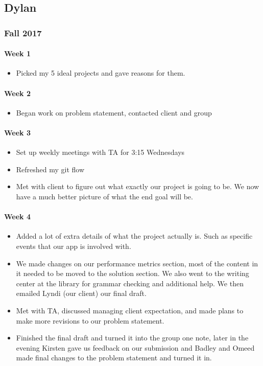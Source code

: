 \documentclass[onecolumn, draftclsnofoot,10pt, compsoc]{IEEEtran}
\begin{document}
  \subsection{Dylan}
    \subsubsection{Fall 2017}
      \paragraph{Week 1}
        \begin{itemize}
          \item Picked my 5 ideal projects and gave reasons for them.
        \end{itemize}

      \paragraph{Week 2}
        \begin{itemize}
          \item Began work on problem statement, contacted client and group
        \end{itemize}

      \paragraph{Week 3}
        \begin{itemize}
          \item Set up weekly meetings with TA for 3:15 Wednesdays
          \item Refreshed my git flow
          \item Met with client to figure out what exactly our project is going to be. We now have a much better picture of what the end goal will be.
        \end{itemize}

      \paragraph{Week 4}
        \begin{itemize}
          \item Added a lot of extra details of what the project actually is. Such as specific events that our app is involved with.
          \item We made changes on our performance metrics section, most of the content in it needed to be moved to the solution section. We also went to the writing center at the library for grammar checking and additional help. We then emailed Lyndi (our client) our final draft.
          \item Met with TA, discussed managing client expectation, and made plans to make more revisions to our problem statement.
          \item Finished the final draft and turned it into the group one note, later in the evening Kirsten gave us feedback on our submission and Badley and Omeed made final changes to the problem statement and turned it in.
        \end{itemize}
\end{document}
